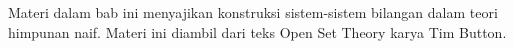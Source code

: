 \documentclass[../../../include/open-logic-section]{subfiles}
\begin{document}
	

\begin{editorial}
Materi dalam bab ini menyajikan konstruksi sistem-sistem bilangan dalam
teori himpunan naif. Materi ini diambil dari teks Open Set Theory karya
Tim Button.
\end{editorial}


\OLEndChapterHook
\end{document}
